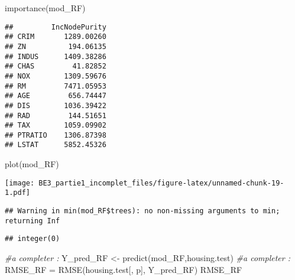 \documentclass[
]{article}
\newenvironment{Shaded}{\begin{snugshade}}{\end{snugshade}}
\newcommand{\AttributeTok}[1]{\textcolor[rgb]{0.77,0.63,0.00}{#1}}
\newcommand{\CommentTok}[1]{\textcolor[rgb]{0.56,0.35,0.01}{\textit{#1}}}
\newcommand{\ConstantTok}[1]{\textcolor[rgb]{0.00,0.00,0.00}{#1}}
\newcommand{\FunctionTok}[1]{\textcolor[rgb]{0.00,0.00,0.00}{#1}}
\newcommand{\NormalTok}[1]{#1}
\newcommand{\OtherTok}[1]{\textcolor[rgb]{0.56,0.35,0.01}{#1}}
\newcommand{\SpecialCharTok}[1]{\textcolor[rgb]{0.00,0.00,0.00}{#1}}
\begin{document}
\begin{Shaded}
\begin{Highlighting}[]
\FunctionTok{importance}\NormalTok{(mod\_RF)}
\end{Highlighting}
\end{Shaded}

\begin{verbatim}
##         IncNodePurity
## CRIM       1289.00260
## ZN          194.06135
## INDUS      1409.38286
## CHAS         41.82852
## NOX        1309.59676
## RM         7471.05953
## AGE         656.74447
## DIS        1036.39422
## RAD         144.51651
## TAX        1059.09902
## PTRATIO    1306.87398
## LSTAT      5852.45326
\end{verbatim}

\begin{Shaded}
\begin{Highlighting}[]
\FunctionTok{plot}\NormalTok{(mod\_RF)}
\end{Highlighting}
\end{Shaded}

\texttt{[image: BE3\_partie1\_incomplet\_files/figure-latex/unnamed-chunk-19-1.pdf]}

\begin{Shaded}
\end{Shaded}

\begin{verbatim}
## Warning in min(mod_RF$trees): no non-missing arguments to min; returning Inf
\end{verbatim}

\begin{verbatim}
## integer(0)
\end{verbatim}

\begin{Shaded}
\begin{Highlighting}[]
\CommentTok{\#a completer :}
\NormalTok{Y\_pred\_RF }\OtherTok{\textless{}{-}} \FunctionTok{predict}\NormalTok{(mod\_RF,housing.test)}
\CommentTok{\#a completer :}
\NormalTok{RMSE\_RF }\OtherTok{=} \FunctionTok{RMSE}\NormalTok{(housing.test[, p], Y\_pred\_RF)}
\NormalTok{RMSE\_RF}
\end{Highlighting}
\end{Shaded}
\end{document}
